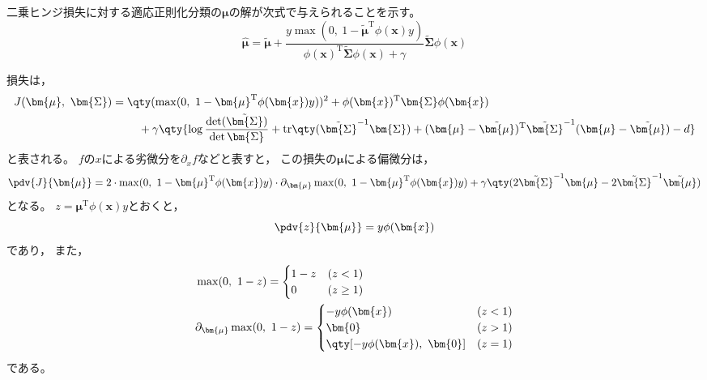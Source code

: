 \documentclass[class=jsarticle, crop=false, dvipdfmx, fleqn]{standalone}
\begin{document}
\section{}

二乗ヒンジ損失に対する適応正則化分類の\(\bm{\mu}\)の解が次式で与えられることを示す。
\begin{equation}
    \hat{\bm{\mu}} = \tilde{\bm{\mu}} + \frac{y \max(0,\ 1 - \tilde{\bm{\mu}}^\mathrm{T} \phi(\bm{x}) y)}{\phi(\bm{x})^\mathrm{T} \tilde{\bm{\Sigma}} \phi(\bm{x}) + \gamma} \tilde{\bm{\Sigma}} \phi(\bm{x})
    \label{eq:objective}
\end{equation}

損失は，
\begin{align}
    J(\bm{\mu},\ \bm{\Sigma})
        & = \qty(\max(0,\ 1 - \bm{\mu}^\mathrm{T} \phi(\bm{x}) y))^2
            + \phi(\bm{x})^\mathrm{T} \bm{\Sigma} \phi(\bm{x})
            \notag \\
        & \ \qquad
            + \gamma \qty{
            \log\frac{\det(\tilde{\bm{\Sigma}})}{\det{\bm{\Sigma}}}
            + \mathrm{tr}\qty(\tilde{\bm{\Sigma}}^{-1} \bm{\Sigma})
            + (\bm{\mu} - \tilde{\bm{\mu}})^\mathrm{T} \tilde{\bm{\Sigma}}^{-1} (\bm{\mu} - \tilde{\bm{\mu}})
            - d
            }
    \label{eq:loss}
\end{align}
と表される。
\(f\)の\(x\)による劣微分を\(\partial_x f\)などと表すと，
この損失の\(\bm{\mu}\)による偏微分は，
\begin{equation}
    \pdv{J}{\bm{\mu}}
        = 2 \cdot \max(0,\ 1 - \bm{\mu}^\mathrm{T} \phi(\bm{x}) y) \cdot \partial_{\bm{\mu}} \max(0,\ 1 - \bm{\mu}^\mathrm{T} \phi(\bm{x}) y)
        + \gamma \qty(2 \tilde{\bm{\Sigma}}^{-1} \bm{\mu} - 2 \tilde{\bm{\Sigma}}^{-1} \tilde{\bm{\mu}})
    \label{eq:deriv_loss}
\end{equation}
となる。
\(z = \bm{\mu}^\mathrm{T} \phi(\bm{x}) y\)とおくと，
\begin{equation}
    \pdv{z}{\bm{\mu}} = y \phi(\bm{x})
    \label{eq:z}
\end{equation}
であり，
また，
\begin{align}
    & \max(0,\ 1 - z) =
        \begin{cases}
            1 - z & (z < 1) \\
            0 & (z \ge 1) \\
        \end{cases}
        \label{eq:max_z} \\
    & \partial_{\bm{\mu}} \max(0,\ 1 - z) =
        \begin{cases}
            - y \phi(\bm{x}) & (z < 1) \\
            \bm{0} & (z > 1) \\
            \qty[- y \phi(\bm{x}),\ \bm{0}] & (z = 1)
        \end{cases}
        \label{eq:subgrad_z} \\
\end{align}
である。
\end{document}

